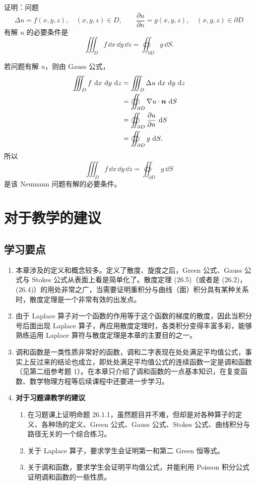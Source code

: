 \begin{xexercise}[9]
证明：问题
\[
  \Delta u=f(x,y,z),\quad (x,y,z)\in D,
  \qquad
  \frac{\partial u}{\partial n}=g(x,y,z),\quad (x,y,z)\in\partial D
\]
有解 $u$ 的必要条件是
\[
  \iiint_D f\,\dd x\,\dd y\,\dd z=\oiint_{\partial D}g\,\dd S.
\]
\end{xexercise}
\begin{xsolution}
若问题有解 $u$，则由 Gauss 公式，
\begin{align*}
  \iiint_D f\,\dd x\,\dd y\,\dd z
  &=\iiint_D\Delta u\,\dd x\,\dd y\,\dd z\\
  &=\oiint_{\partial D}\nabla u\cdot\vect{n}\,\dd S\\
  &=\oiint_{\partial D}\frac{\partial u}{\partial n}\,\dd S\\
  &=\oiint_{\partial D}g\,\dd S.
\end{align*}
所以
\[
  \boxed{
  \iiint_D f\,\dd x\,\dd y\,\dd z
  =\oiint_{\partial D}g\,\dd S
  }
\]
是该 Neumann 问题有解的必要条件。
\end{xsolution}


\section{对于教学的建议}

\subsection{学习要点}

\begin{enumerate}[label=\arabic*.]
  \item 本章涉及的定义和概念较多。定义了散度、旋度之后，Green 公式、Gauss 公式与 Stokes 公式从表面上看是简单化了。散度定理 (26.5)（或者是 (26.2)，(26.4)）的用处非常之广，当需要证明重积分与曲线（面）积分具有某种关系时，散度定理是一个非常有效的出发点。
  \item 由于 Laplace 算子对一个函数的作用等于这个函数的梯度的散度，因此当积分号后面出现 Laplace 算子，再应用散度定理时，各类积分变得丰富多彩，能够熟练运用 Laplace 算符与散度定理是本章的主要目的之一。
  \item 调和函数是一类性质非常好的函数，调和二字表现在处处满足平均值公式，事实上反过来的结论也成立，即处处满足平均值公式的连续函数一定是调和函数（见第二组参考题 1）。在本章只介绍了调和函数的一点基本知识，在复变函数、数学物理方程等后续课程中还要进一步学习。
  \item \textbf{对于习题课教学的建议}
  \begin{enumerate}[label=(\arabic*)]
    \item 在习题课上证明命题 26.1.1，虽然题目并不难，但却是对各种算子的定义、各种场的定义、Green 公式、Gauss 公式、Stokes 公式、曲线积分与路径无关的一个综合练习。
    \item 关于 Laplace 算子，要求学生会证明第一和第二 Green 恒等式。
    \item 关于调和函数，要求学生会证明平均值公式，并能利用 Poisson 积分公式证明调和函数的一些性质。
  \end{enumerate}
\end{enumerate}

